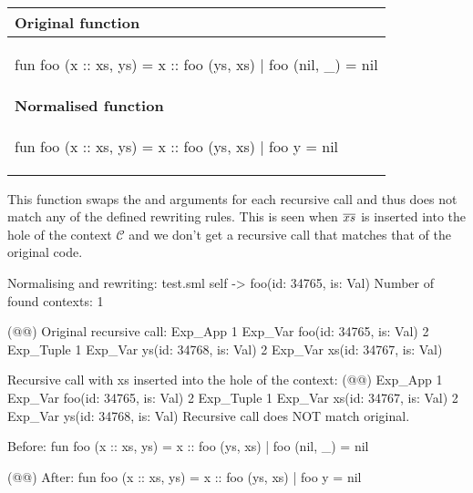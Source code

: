 \begin{example}\
  \label{ex:eval-map-rewrite-foo}\\

  \begin{center}
    \begin{tabular}{|l|}
      \hline
      \textbf{Original function}
      \\\hline
      \begin{sml}
fun foo (x :: xs, ys) = x :: foo (ys, xs)
  | foo (nil, _) = nil
      \end{sml}
      \\\hline
      \textbf{Normalised function}
      \\\hline
      \begin{sml}
fun foo (x :: xs, ys) = x :: foo (ys, xs)
  | foo y = nil        
      \end{sml}
      \\\hline
    \end{tabular}
  \end{center}

  \noindent
  This function swaps the  and  arguments for each recursive
  call and thus does not match any of the defined \tsf{map} rewriting
  rules. This is seen when $\overline{xs}$ is inserted into the hole of the context
  $\mathcal{C}$ and we don't get a recursive call that matches that of the
  original code.

  \begin{narrow}{-3em}{0em}
    \setlength{\linewidth}{1.2\linewidth}
    \footnotesize
    
    \begin{multicols}{2}           
      \begin{sml}
Normalising and rewriting: test.sml
self -> foo(id: 34765, is: Val)
Number of found contexts: 1

(@@)
Original recursive call:
Exp_App
  1 Exp_Var foo(id: 34765, is: Val)
  2 Exp_Tuple
      1 Exp_Var ys(id: 34768, is: Val)
      2 Exp_Var xs(id: 34767, is: Val)


Recursive call with xs inserted into the hole
of the context:
(@@)
Exp_App
  1 Exp_Var foo(id: 34765, is: Val)
  2 Exp_Tuple
      1 Exp_Var xs(id: 34767, is: Val)
      2 Exp_Var ys(id: 34768, is: Val)
Recursive call does NOT match original.

Before:
fun foo (x :: xs, ys) = x :: foo (ys, xs)
  | foo (nil, _) = nil

(@@)
After:
fun foo (x :: xs, ys) = x :: foo (ys, xs)
  | foo y = nil
      \end{sml}
    \end{multicols}
  \end{narrow} 
\end{example}


